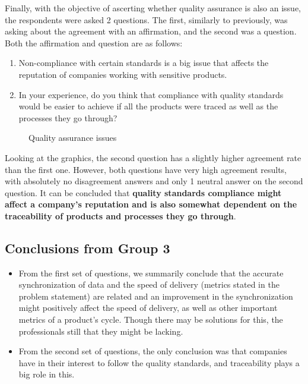Finally, with the objective of ascerting whether quality assurance is also an issue, the respondents were asked 2 questions. The first, similarly to previously, was asking about the agreement with an affirmation, and the second was a question. Both the affirmation and question are as follows:

\begin{enumerate}
  \item Non-compliance with certain standards is a big issue that affects the reputation of companies working with sensitive products.
  \item In your experience, do you think that compliance with quality standards would be easier to achieve if all the products were traced as well as the processes they go through?
\end{enumerate}

\begin{figure}[h]

    \caption{Quality assurance issues}
  \label{fig:group3_graphics2}
\end{figure}

Looking at the graphics, the second question has a slightly higher agreement rate than the first one. However, both questions have very high agreement results, with absolutely no disagreement answers and only 1 neutral answer on the second question. It can be concluded that \textbf{quality standards compliance might affect a company's reputation and is also somewhat dependent on the traceability of products and processes they go through}.


\subsection*{Conclusions from Group 3}


\begin{itemize}
  \item From the first set of questions, we summarily conclude that the accurate synchronization of data and the speed of delivery (metrics stated in the problem statement) are related and an improvement in the synchronization might positively affect the speed of delivery, as well as other important metrics of a product's cycle. Though there may be solutions for this, the professionals still that they might be lacking.

  \item From the second set of questions, the only conclusion was that companies have in their interest to follow the quality standards, and traceability plays a big role in this.
\end{itemize}

